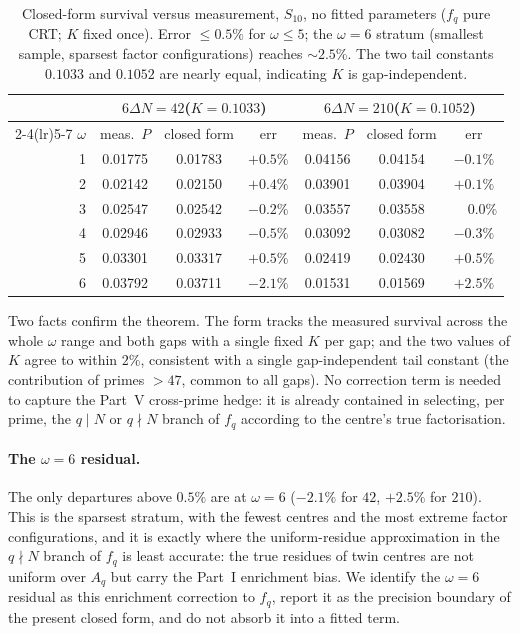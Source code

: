 \documentclass[11pt]{article}
\begin{document}
\begin{table}[h]\centering
\small
\begin{tabular}{rccc@{\hskip 2.2em}ccc}
\toprule
& \multicolumn{3}{c}{$6\Delta N=42$\quad($K=0.1033$)} & \multicolumn{3}{c}{$6\Delta N=210$\quad($K=0.1052$)}\\
\cmidrule(lr){2-4}\cmidrule(lr){5-7}
$\omega$ & meas.\ $P$ & closed form & err & meas.\ $P$ & closed form & err\\
\midrule
1 & 0.01775 & 0.01783 & $+0.5\%$ & 0.04156 & 0.04154 & $-0.1\%$\\
2 & 0.02142 & 0.02150 & $+0.4\%$ & 0.03901 & 0.03904 & $+0.1\%$\\
3 & 0.02547 & 0.02542 & $-0.2\%$ & 0.03557 & 0.03558 & $\phantom{+}0.0\%$\\
4 & 0.02946 & 0.02933 & $-0.5\%$ & 0.03092 & 0.03082 & $-0.3\%$\\
5 & 0.03301 & 0.03317 & $+0.5\%$ & 0.02419 & 0.02430 & $+0.5\%$\\
6 & 0.03792 & 0.03711 & $-2.1\%$ & 0.01531 & 0.01569 & $+2.5\%$\\
\bottomrule
\end{tabular}
\caption{Closed-form survival versus measurement, $S_{10}$, no fitted parameters
($f_q$ pure CRT; $K$ fixed once). Error $\leq0.5\%$ for $\omega\leq5$; the
$\omega=6$ stratum (smallest sample, sparsest factor configurations) reaches
$\sim2.5\%$. The two tail constants $0.1033$ and $0.1052$ are nearly equal,
indicating $K$ is gap-independent.}
\label{tab:closed}
\end{table}

Two facts confirm the theorem. The form tracks the measured survival across the
whole $\omega$ range and both gaps with a single fixed $K$ per gap; and the two
values of $K$ agree to within $2\%$, consistent with a single gap-independent
tail constant (the contribution of primes $>47$, common to all gaps). No
correction term is needed to capture the Part~V cross-prime hedge: it is already
contained in selecting, per prime, the $q\mid N$ or $q\nmid N$ branch of $f_q$
according to the centre's true factorisation.

\paragraph{The $\omega=6$ residual.}
The only departures above $0.5\%$ are at $\omega=6$ ($-2.1\%$ for $42$, $+2.5\%$
for $210$). This is the sparsest stratum, with the fewest centres and the most
extreme factor configurations, and it is exactly where the uniform-residue
approximation in the $q\nmid N$ branch of $f_q$ is least accurate: the true
residues of twin centres are not uniform over $A_q$ but carry the Part~I
enrichment bias. We identify the $\omega=6$ residual as this enrichment
correction to $f_q$, report it as the precision boundary of the present
closed form, and do not absorb it into a fitted term.
\end{document}
